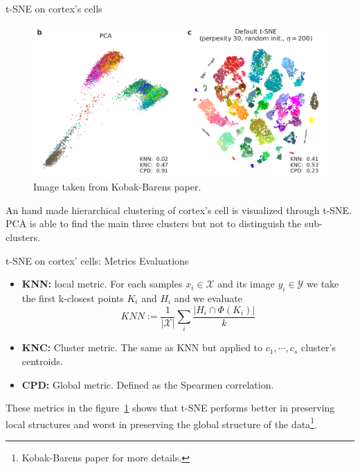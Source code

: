 \documentclass[10pt]{beamer}
\theoremstyle{definition}
\newcommand{\1}{\mathbbm{1}}
\newcommand{\XX}{\mathcal{X}}
\newcommand{\YY}{\mathcal{Y}}
\begin{document}
\begin{frame}{t-SNE on cortex's cells}
  \begin{figure}[h!]
    \centering
    \includegraphics[scale=0.27]{./pic/cells.png}
    \caption{Image taken from Kobak-Barens paper.}
    \label{cortex}
  \end{figure}
  An hand made hierarchical clustering of cortex's cell is visualized
  through t-SNE\@. PCA is able to find the main three clusters but not to
  distinguish the sub-clusters.
\end{frame}
\begin{frame}{t-SNE on cortex' cells: Metrics Evaluations}
  \begin{itemize}
    \item {\bf KNN:} local metric. For each samples $x_i\in\XX$ and its
      image $y_i\in\YY$ we take the first k-closest points $K_i$ and $H_i$
      and we evaluate
      \[
        KNN := \frac{1}{|\XX|}\sum_i \frac{|H_i\cap \Phi(K_i)|}{k}
      \]
    \item {\bf KNC:} Cluster metric. The same as KNN but applied to
      $c_1,\cdots,c_s$ cluster's centroids.
    \item {\bf CPD:} Global metric. Defined as the Spearmen
      correlation.
  \end{itemize}
  These metrics in the figure~\ref{cortex} shows that t-SNE performs
  better in preserving local structures and worst in preserving the global
  structure of the data\footnote{Kobak-Barens paper for more details.}.
\end{frame}
\end{document}
